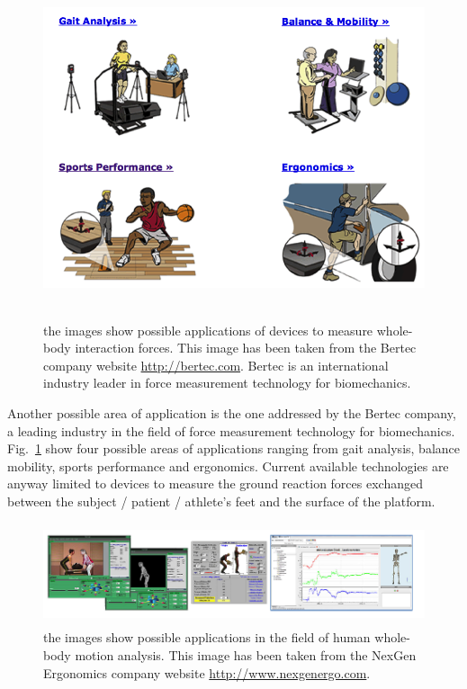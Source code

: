 \documentclass[12pt,a4paper,twoside]{article}
\begin{document}
\begin{figure} 
\begin{center}
\includegraphics[height=10cm]{images/bertec.png}
\caption{the images show possible applications of devices to measure whole-body interaction forces. This image has been taken from the Bertec company website \protect\url{http://bertec.com}. Bertec is an international industry leader in force measurement technology for biomechanics.}\label{fig:bertec}
\end{center}
\end{figure}

Another possible area of application is the one addressed by the Bertec company, a leading industry in the field of force measurement technology for biomechanics. Fig.~\ref{fig:bertec} show four possible areas of applications ranging from gait analysis, balance mobility, sports performance and ergonomics. Current available technologies are anyway limited to devices to measure the ground reaction forces exchanged between the subject / patient / athlete’s feet and the surface of the platform. 

\begin{figure}
\begin{center}
\includegraphics[height=3cm]{images/nexGen.png} 
\caption{the images show possible applications in the field of human whole-body motion analysis. This image has been taken from the NexGen Ergonomics company website \protect\url{http://www.nexgenergo.com}. }\label{fig:nexGen}
\end{center}
\end{figure}
\end{document}
